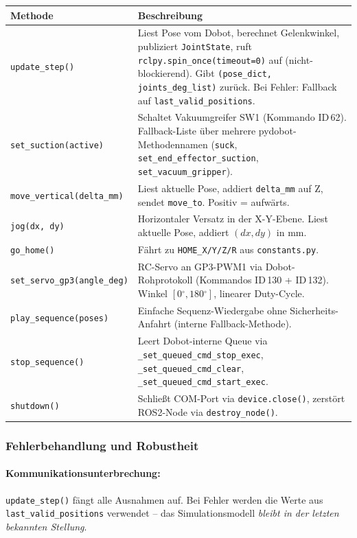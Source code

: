 \documentclass[11pt,a4paper]{article}
\begin{document}
\begin{longtable}{lp{9.5cm}}
  \toprule
  Methode & Beschreibung \\
  \midrule
  \endhead
  \texttt{update\_step()} &
    Liest Pose vom Dobot, berechnet Gelenkwinkel, publiziert
    \texttt{JointState}, ruft \texttt{rclpy.spin\_once(timeout=0)}
    auf (nicht-blockierend). Gibt
    \texttt{(pose\_dict, joints\_deg\_list)} zurück. Bei Fehler:
    Fallback auf \texttt{last\_valid\_positions}. \\[4pt]
  \texttt{set\_suction(active)} &
    Schaltet Vakuumgreifer SW1 (Kommando ID\,62). Fallback-Liste
    über mehrere pydobot-Methodennamen
    (\texttt{suck}, \texttt{set\_end\_effector\_suction},
    \texttt{set\_vacuum\_gripper}). \\[4pt]
  \texttt{move\_vertical(delta\_mm)} &
    Liest aktuelle Pose, addiert \texttt{delta\_mm} auf Z,
    sendet \texttt{move\_to}. Positiv = aufwärts. \\[4pt]
  \texttt{jog(dx, dy)} &
    Horizontaler Versatz in der X-Y-Ebene. Liest aktuelle Pose,
    addiert $(dx, dy)$ in mm. \\[4pt]
  \texttt{go\_home()} &
    Fährt zu \texttt{HOME\_X/Y/Z/R} aus \texttt{constants.py}. \\[4pt]
  \texttt{set\_servo\_gp3(angle\_deg)} &
    RC-Servo an GP3-PWM1 via Dobot-Rohprotokoll
    (Kommandos ID\,130 + ID\,132). Winkel $[0{{}^\circ},180{{}^\circ}]$,
    linearer Duty-Cycle. \\[4pt]
  \texttt{play\_sequence(poses)} &
    Einfache Sequenz-Wiedergabe ohne Sicherheits-Anfahrt
    (interne Fallback-Methode). \\[4pt]
  \texttt{stop\_sequence()} &
    Leert Dobot-interne Queue via
    \texttt{\_set\_queued\_cmd\_stop\_exec},
    \texttt{\_set\_queued\_cmd\_clear},
    \texttt{\_set\_queued\_cmd\_start\_exec}. \\[4pt]
  \texttt{shutdown()} &
    Schließt COM-Port via \texttt{device.close()},
    zerstört ROS2-Node via \texttt{destroy\_node()}. \\
  \bottomrule
\end{longtable}

\subsubsection{Fehlerbehandlung und Robustheit}

\paragraph{Kommunikationsunterbrechung:}
\texttt{update\_step()} fängt alle Ausnahmen auf. Bei Fehler werden
die Werte aus \texttt{last\_valid\_positions} verwendet -- das
Simulationsmodell \emph{bleibt in der letzten bekannten Stellung}.
\end{document}
